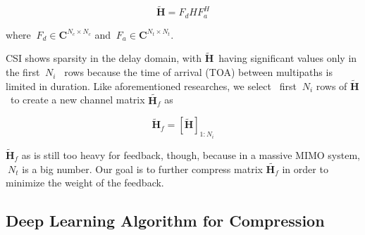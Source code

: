 \documentclass[lettersize,journal]{IEEEtran}
\begin{document}
\begin{equation}
 \tilde{\textbf{H}}=F_{d}HF^{H}_{a}
\end{equation}

where  \begin{math} \ F_{d}\in \textbf{C}^{N_{c}\times N_{c}}\end{math} and \begin{math} \ F_{a}\in \textbf{C}^{N_{t}\times N_{t}}\end{math}.

CSI shows sparsity in the delay domain, with \begin{math} \tilde{\textbf{H}} \end{math} having significant values only in the first \begin{math} \ N_{i} \end{math}  rows because the time of arrival (TOA) between multipaths is limited in duration. Like aforementioned researches, we select  first 
\begin{math} \ N_{i} \end{math} rows of \begin{math} \tilde{\textbf{H}} \end{math} to create a new channel matrix \begin{math} \tilde{\textbf{H}_{f}} \end{math} as

\begin{equation}
 	 \tilde{\textbf{H}}_{f}=\left[ \tilde{\textbf{H}} \right]_{1:N_{i}} 
\end{equation}

\begin{math} \tilde{\textbf{H}}_{f} \end{math} as is still too heavy for feedback, though, because in a massive MIMO system, \begin{math}\ N_{t}\end{math} is a big number. Our goal is to further compress matrix \begin{math} \tilde{\textbf{H}_{f}} \end{math} in order to minimize the weight of the feedback. 

\subsection{Deep Learning Algorithm for Compression}\label{AA}
\end{document}
